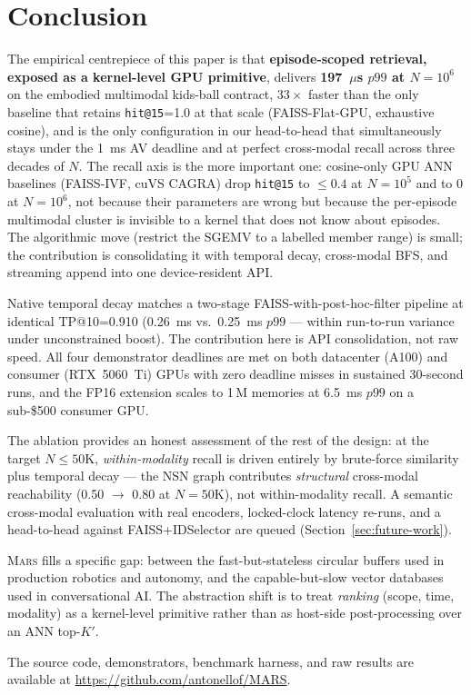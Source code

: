 \documentclass[11pt]{article}
\newcommand{\mars}{\textsc{Mars}}
\begin{document}
\section{Conclusion}

The empirical centrepiece of this paper is that
\textbf{episode-scoped retrieval, exposed as a kernel-level GPU
primitive}, delivers \textbf{197~$\mu$s $p99$ at $N{=}10^6$} on the
embodied multimodal kids-ball contract, $33\times$ faster than the
only baseline that retains \texttt{hit@15}=1.0 at that scale
(FAISS-Flat-GPU, exhaustive cosine), and is the only configuration
in our head-to-head that simultaneously stays under the 1~ms AV
deadline and at perfect cross-modal recall across three decades of
$N$. The recall axis is the more important one: cosine-only GPU ANN
baselines (FAISS-IVF, cuVS CAGRA) drop \texttt{hit@15} to $\le 0.4$
at $N{=}10^5$ and to $0$ at $N{=}10^6$, not because their parameters
are wrong but because the per-episode multimodal cluster is invisible
to a kernel that does not know about episodes. The
algorithmic move (restrict the SGEMV to a labelled member range) is
small; the contribution is consolidating it with temporal decay,
cross-modal BFS, and streaming append into one device-resident API.

Native temporal decay matches a two-stage FAISS-with-post-hoc-filter
pipeline at identical TP@10=0.910 (0.26~ms vs.\ 0.25~ms $p99$ ---
within run-to-run variance under unconstrained boost). The
contribution here is API consolidation, not raw speed. All four
demonstrator deadlines are met on both datacenter (A100) and consumer
(RTX~5060~Ti) GPUs with zero deadline misses in sustained 30-second
runs, and the FP16 extension scales to 1\,M memories at 6.5~ms $p99$
on a sub-\$500 consumer GPU.

The ablation provides an honest assessment of the rest of the design:
at the target $N \le 50$K, \emph{within-modality} recall is driven
entirely by brute-force similarity plus temporal decay --- the NSN
graph contributes \emph{structural} cross-modal reachability (0.50
$\to$ 0.80 at $N{=}50$K), not within-modality recall. A semantic
cross-modal evaluation with real encoders, locked-clock latency
re-runs, and a head-to-head against FAISS+IDSelector are queued
(Section~\ref{sec:future-work}).

\mars{} fills a specific gap: between the fast-but-stateless circular
buffers used in production robotics and autonomy, and the
capable-but-slow vector databases used in conversational AI. The
abstraction shift is to treat \emph{ranking} (scope, time, modality)
as a kernel-level primitive rather than as host-side post-processing
over an ANN top-$K'$.

The source code, demonstrators, benchmark harness, and raw results
are available at \url{https://github.com/antonellof/MARS}.



\end{document}
